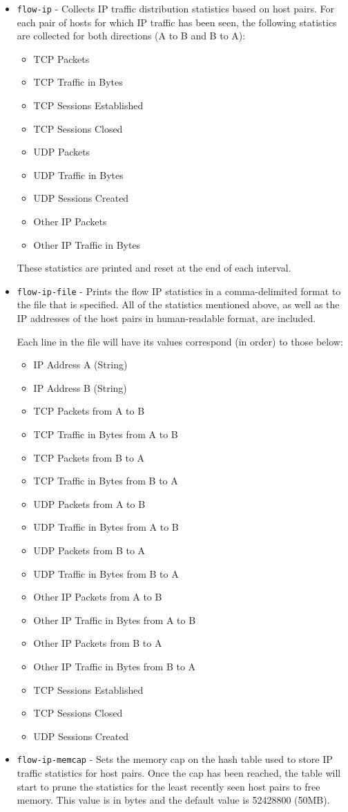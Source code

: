 \documentclass[english]{report}
\begin{document}
\begin{itemize}
\item \texttt{flow-ip} - Collects IP traffic distribution statistics based on
host pairs.  For each pair of hosts for which IP traffic has been seen, the
following statistics are collected for both directions (A to B and B to A):
\begin{itemize}
\item TCP Packets
\item TCP Traffic in Bytes
\item TCP Sessions Established
\item TCP Sessions Closed
\item UDP Packets
\item UDP Traffic in Bytes
\item UDP Sessions Created
\item Other IP Packets
\item Other IP Traffic in Bytes
\end{itemize}
These statistics are printed and reset at the end of each interval.

\item \texttt{flow-ip-file} - Prints the flow IP statistics in a
comma-delimited format to the file that is specified.  All of the statistics
mentioned above, as well as the IP addresses of the host pairs in
human-readable format, are included.

Each line in the file will have its values correspond (in order) to those below:
\begin{itemize}
\item IP Address A (String)
\item IP Address B (String)
\item TCP Packets from A to B
\item TCP Traffic in Bytes from A to B
\item TCP Packets from B to A
\item TCP Traffic in Bytes from B to A
\item UDP Packets from A to B
\item UDP Traffic in Bytes from A to B
\item UDP Packets from B to A
\item UDP Traffic in Bytes from B to A
\item Other IP Packets from A to B
\item Other IP Traffic in Bytes from A to B
\item Other IP Packets from B to A
\item Other IP Traffic in Bytes from B to A
\item TCP Sessions Established
\item TCP Sessions Closed
\item UDP Sessions Created
\end{itemize}

\item \texttt{flow-ip-memcap} - Sets the memory cap on the hash table used to
store IP traffic statistics for host pairs.  Once the cap has been reached, the
table will start to prune the statistics for the least recently seen host pairs
to free memory.  This value is in bytes and the default value is
52428800 (50MB).

\end{itemize}
\end{document}
